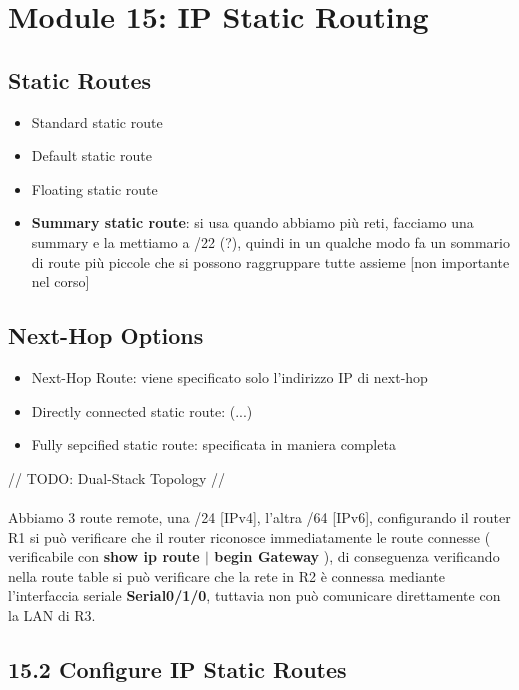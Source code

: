 \documentclass[12pt, a4paper]{article}
\begin{document}
	
	
	\section*{Module 15: IP Static Routing}
	
	\subsection*{Static Routes}
	\begin{itemize}
		\item Standard static route
		\item Default static route
		\item Floating static route
		\item \textbf{Summary static route}: si usa quando abbiamo più reti, facciamo una summary e la mettiamo a /22 (?), quindi in un qualche modo fa un sommario di route più piccole che si possono raggruppare tutte assieme [non importante nel corso]
	\end{itemize}

	\subsection*{Next-Hop Options}
	
	\begin{itemize}
		\item Next-Hop Route: viene specificato solo l'indirizzo IP di next-hop
		\item Directly connected static route: (...)
		\item Fully sepcified static route: specificata in maniera completa
	\end{itemize}

	// TODO: Dual-Stack Topology // \\ \\
	
	Abbiamo 3 route remote, una /24 [IPv4], l'altra /64 [IPv6], configurando il router R1 si può verificare che il router riconosce immediatamente le route connesse ( verificabile con \textbf{show ip route $|$ begin Gateway} ), di conseguenza verificando nella route table si può verificare che la rete in R2 è connessa mediante l'interfaccia seriale \textbf{Serial0/1/0}, tuttavia non può comunicare direttamente con la LAN di R3.
	
	
	\subsection*{15.2 Configure IP Static Routes}
	
\end{document}
